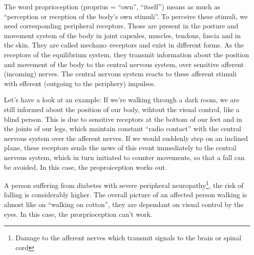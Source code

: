 \documentclass[../main.tex]{subfiles}
\begin{document}
The word  proprioception (proprius = ``own'', ``itself'') means as much as ``{perception} or reception of the {body's own stimuli}''.
To perceive these stimuli, we need corresponding {peripheral receptors}.
Those are present in the posture and movement system of the body in joint capsules, muscles, tendons, fascia and in the skin.
They are called {mechano--receptors} and exist in different forms. 
As the receptors of the equilibrium system, they transmit information about the {position and movement of the body} to the central nervous system, over sensitive afferent (incoming) nerves.
The central nervous system {reacts} to these afferent stimuli with efferent (outgoing to the periphery) impulses.

Let's have a look at an example: \newline
If we're walking through a dark room, we are still informed about the position of our body, wihtout the visual control, like a blind person.
This is due to sensitive receptors at the bottom of our feet and in the joints of our legs, which maintain constant ``radio contact'' with the central nervous system over the afferent nerves.
If we would suddenly step on an inclined plane, these receptors sends the news of this event immediately to the central nervous system, which in turn initiated to counter movements, so that a fall can be avoided.
In this case, the proproiception works out.

A person suffering from diabetes with severe peripheral neuropathy\footnote{Damage to the afferent nerves which transmit signals to the brain or spinal cord},
the risk of falling is considerably higher.
The overall picture of an affected person walking is almost like on ``walking on cotton'', they are dependant on visual control by the eyes.
In this case, the prorprioception can't work.
\end{document}
